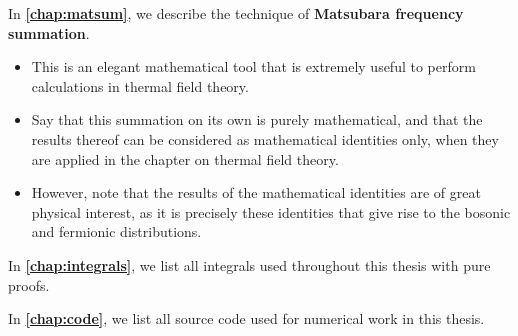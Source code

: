 In \textbf{\cref{chap:matsum}}, we describe the technique of \textbf{Matsubara frequency summation}.
\begin{itemize}
\item This is an elegant mathematical tool that is extremely useful to perform calculations in thermal field theory.
\item Say that this summation on its own is purely mathematical, and that the results thereof can be considered as mathematical identities only, when they are applied in the chapter on thermal field theory.
\item However, note that the results of the mathematical identities are of great physical interest, as it is precisely these identities that give rise to the bosonic and fermionic distributions.
\end{itemize}

In \textbf{\cref{chap:integrals}}, we list all integrals used throughout this thesis with pure proofs.

In \textbf{\cref{chap:code}}, we list all source code used for numerical work in this thesis.
